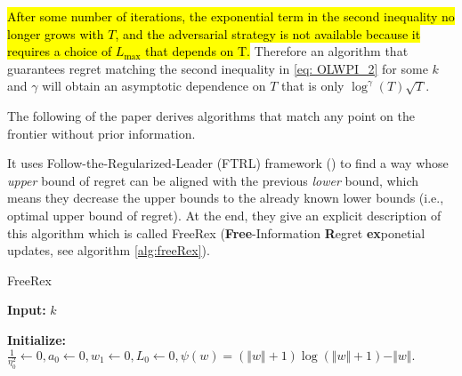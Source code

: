 \hl{After some number of iterations, the exponential term in the second inequality no longer grows with $T$, and the adversarial strategy is not available because it requires a choice of $L_{\max}$ that depends on T.} Therefore an algorithm that guarantees regret matching the second inequality in \ref{eq: OLWPI_2} for some $k$ and $\gamma$ will obtain an asymptotic dependence on $T$ that is only $\log^\gamma (T)\sqrt{T}$.

The following of the paper derives algorithms that match any point on the frontier without prior information.

It uses Follow-the-Regularized-Leader (FTRL) framework (\cite{shalev2012online}) to find a way whose \textit{upper} bound of regret can be aligned with the previous \textit{lower} bound, which means they decrease the upper bounds to the already known lower bounds (i.e., optimal upper bound of regret). At the end, they give an explicit description of this algorithm  which is called FreeRex (\textbf{Free}-Information \textbf{R}egret \textbf{ex}ponetial updates, see algorithm \ref{alg:freeRex}).
\begin{algorithm}
\caption{FreeRex}
\label{alg:freeRex}
{\bfseries Input:} $k$

{\bfseries Initialize:} $\frac{1}{\eta_0^2} \leftarrow 0, a_0 \leftarrow 0, w_1 \leftarrow 0, L_0 \leftarrow 0, \psi(w) = (\Vert w \Vert + 1)\log(\Vert w \Vert + 1) - \Vert w \Vert.$
\begin{algorithmic}[1]
\EndFor
\end{algorithmic}
\end{algorithm}